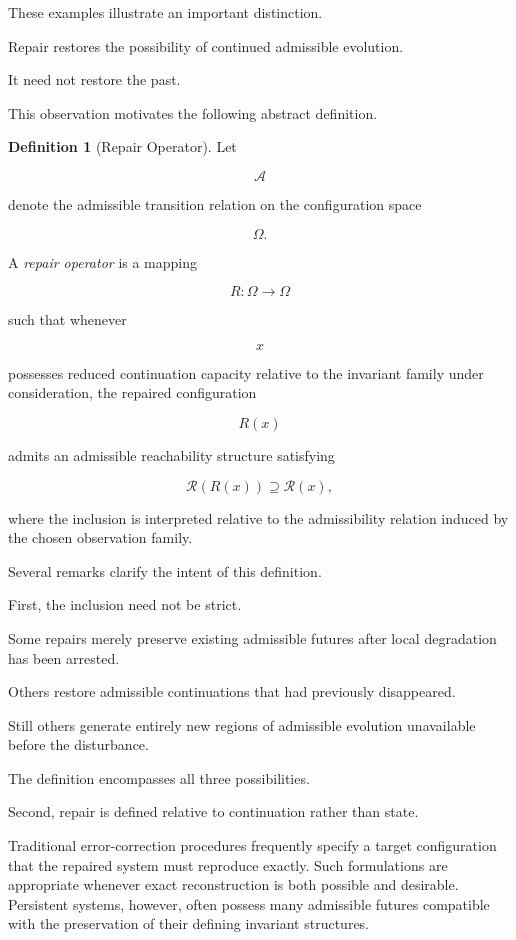 \documentclass[11pt]{book}
\numberwithin{equation}{chapter}
\theoremstyle{definition}
\newtheorem{definition}{Definition}[chapter]
\theoremstyle{plain}
\begin{document}
These examples illustrate an important distinction.

Repair restores the possibility of continued admissible evolution.

It need not restore the past.

This observation motivates the following abstract definition.

\begin{definition}[Repair Operator]

Let

\[
\mathcal{A}
\]

denote the admissible transition relation on the configuration space

\[
\Omega.
\]

A \emph{repair operator} is a mapping

\[
R:\Omega\longrightarrow\Omega
\]

such that whenever

\[
x
\]

possesses reduced continuation capacity relative to the invariant family under consideration, the repaired configuration

\[
R(x)
\]

admits an admissible reachability structure satisfying

\[
\mathcal{R}(R(x))
\supseteq
\mathcal{R}(x),
\]

where the inclusion is interpreted relative to the admissibility relation induced by the chosen observation family.

\end{definition}

Several remarks clarify the intent of this definition.

First, the inclusion need not be strict.

Some repairs merely preserve existing admissible futures after local degradation has been arrested.

Others restore admissible continuations that had previously disappeared.

Still others generate entirely new regions of admissible evolution unavailable before the disturbance.

The definition encompasses all three possibilities.

Second, repair is defined relative to continuation rather than state.

Traditional error-correction procedures frequently specify a target configuration that the repaired system must reproduce exactly. Such formulations are appropriate whenever exact reconstruction is both possible and desirable. Persistent systems, however, often possess many admissible futures compatible with the preservation of their defining invariant structures.
\end{document}
